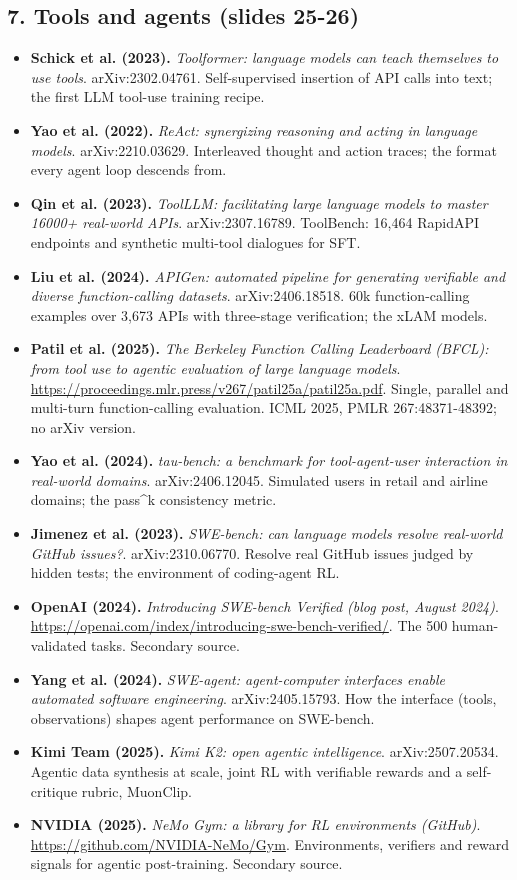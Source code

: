 \documentclass[11pt,letterpaper]{article}
\begin{document}
\subsection*{7. Tools and agents (slides 25-26)}
\begin{itemize}[leftmargin=1.2em,itemsep=3pt]\sloppy
\item \textbf{Schick et al. (2023).} \textit{Toolformer: language models can teach themselves to use tools}. arXiv:2302.04761. Self-supervised insertion of API calls into text; the first LLM tool-use training recipe.
\item \textbf{Yao et al. (2022).} \textit{ReAct: synergizing reasoning and acting in language models}. arXiv:2210.03629. Interleaved thought and action traces; the format every agent loop descends from.
\item \textbf{Qin et al. (2023).} \textit{ToolLLM: facilitating large language models to master 16000+ real-world APIs}. arXiv:2307.16789. ToolBench: 16,464 RapidAPI endpoints and synthetic multi-tool dialogues for SFT.
\item \textbf{Liu et al. (2024).} \textit{APIGen: automated pipeline for generating verifiable and diverse function-calling datasets}. arXiv:2406.18518. 60k function-calling examples over 3,673 APIs with three-stage verification; the xLAM models.
\item \textbf{Patil et al. (2025).} \textit{The Berkeley Function Calling Leaderboard (BFCL): from tool use to agentic evaluation of large language models}. \url{https://proceedings.mlr.press/v267/patil25a/patil25a.pdf}. Single, parallel and multi-turn function-calling evaluation. ICML 2025, PMLR 267:48371-48392; no arXiv version.
\item \textbf{Yao et al. (2024).} \textit{tau-bench: a benchmark for tool-agent-user interaction in real-world domains}. arXiv:2406.12045. Simulated users in retail and airline domains; the pass\^{}k consistency metric.
\item \textbf{Jimenez et al. (2023).} \textit{SWE-bench: can language models resolve real-world GitHub issues?}. arXiv:2310.06770. Resolve real GitHub issues judged by hidden tests; the environment of coding-agent RL.
\item \textbf{OpenAI (2024).} \textit{Introducing SWE-bench Verified (blog post, August 2024)}. \url{https://openai.com/index/introducing-swe-bench-verified/}. The 500 human-validated tasks. Secondary source.
\item \textbf{Yang et al. (2024).} \textit{SWE-agent: agent-computer interfaces enable automated software engineering}. arXiv:2405.15793. How the interface (tools, observations) shapes agent performance on SWE-bench.
\item \textbf{Kimi Team (2025).} \textit{Kimi K2: open agentic intelligence}. arXiv:2507.20534. Agentic data synthesis at scale, joint RL with verifiable rewards and a self-critique rubric, MuonClip.
\item \textbf{NVIDIA (2025).} \textit{NeMo Gym: a library for RL environments (GitHub)}. \url{https://github.com/NVIDIA-NeMo/Gym}. Environments, verifiers and reward signals for agentic post-training. Secondary source.
\end{itemize}
\end{document}

